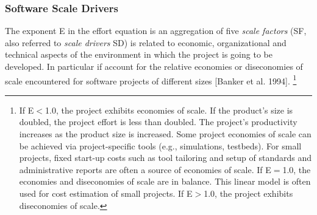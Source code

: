 \subsubsection{Software Scale Drivers}

The exponent E in the effort equation is an aggregation of five \emph{scale
factors} (SF, also referred to \emph{scale drivers} SD) is related
to economic, organizational and technical aspects of the environment
in which the project is going to be developed. In particular if account
for the relative economies or diseconomies of scale encountered for
software projects of different sizes {[}Banker et al. 1994{]}. %
\footnote{If E$<$1.0, the project exhibits economies of scale. If the product’s
size is doubled, the project effort is less than doubled. The project’s
productivity increases as the product size is increased. Some project
economies of scale can be achieved via project-specific tools (e.g.,
simulations, testbeds). For small projects, fixed start-up costs such
as tool tailoring and setup of standards and administrative reports
are often a source of economies of scale. If E$=$1.0, the economies
and diseconomies of scale are in balance. This linear model is often
used for cost estimation of small projects. If E$>$1.0, the project
exhibits diseconomies of scale.%
}


